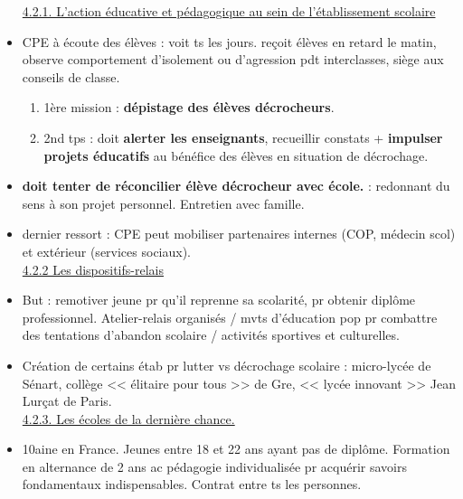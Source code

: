 \documentclass[12pt]{report}
\begin{document}
\begin{itemize}
\underline{4.2.1. L'action éducative et pédagogique au sein de l'établissement scolaire} \\

\item CPE à écoute des élèves : voit ts les jours.  reçoit élèves en retard le matin, observe comportement d'isolement ou d'agression pdt interclasses, siège aux conseils de classe. 
\begin{enumerate}
\item 1ère mission : \textbf{dépistage des élèves décrocheurs}. \\
\item 2nd tps : doit \textbf{alerter les enseignants}, recueillir constats + \textbf{impulser projets éducatifs} au bénéfice des élèves en situation de décrochage. \\
\end{enumerate}

\item \textbf{doit tenter de réconcilier élève décrocheur avec école.} : redonnant du sens à son projet personnel. Entretien avec famille. \\

\item  dernier ressort : CPE peut mobiliser partenaires internes (COP, médecin scol) et extérieur (services sociaux). \\

\underline{4.2.2 Les dispositifs-relais} \\

\item But : remotiver jeune pr qu'il reprenne sa scolarité, pr obtenir diplôme professionnel. Atelier-relais organisés / mvts d'éducation pop pr combattre des tentations d'abandon scolaire / activités sportives et culturelles. \\

\item Création de certains étab pr lutter vs décrochage scolaire : micro-lycée de Sénart, collège << élitaire pour tous >> de Gre, << lycée innovant >> Jean Lurçat de Paris. \\

\underline{4.2.3. Les écoles de la dernière chance.} \\

\item 10aine en France. Jeunes entre 18 et 22 ans ayant pas de diplôme. Formation en alternance de 2 ans ac pédagogie individualisée pr acquérir savoirs fondamentaux indispensables. Contrat entre ts les personnes. \\


\end{itemize}
\end{document}
